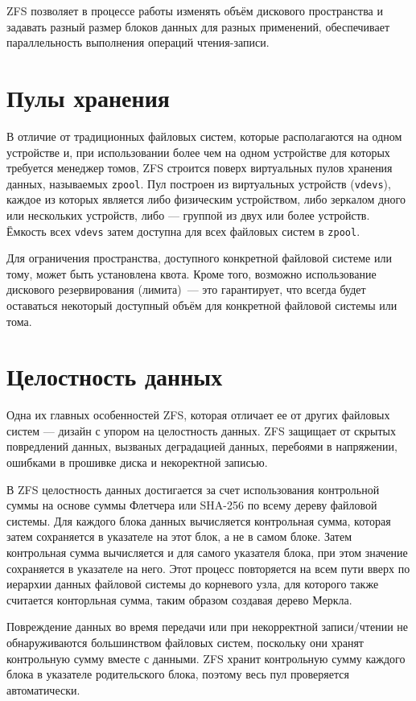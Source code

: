 \documentclass[a4page]{article}
\begin{document}
ZFS позволяет в процессе работы изменять объём дискового пространства
и задавать разный размер блоков данных для разных применений,
обеспечивает параллельность выполнения операций чтения-записи.

\section{Пулы хранения}

В отличие от традиционных файловых систем, которые располагаются на одном устройстве и,
при использовании более чем на одном устройстве для которых требуется менеджер томов,
ZFS строится поверх виртуальных пулов хранения данных, называемых \texttt{zpool}.
Пул построен из виртуальных устройств (\texttt{vdevs}),
каждое из которых является либо физическим устройством,
либо зеркалом дного или нескольких устройств,
либо --- группой из двух или более устройств.
Ёмкость всех \texttt{vdevs} затем доступна для всех файловых систем в \texttt{zpool}.

Для ограничения пространства, доступного конкретной файловой системе или тому, может быть установлена квота.
Кроме того, возможно использование дискового резервирования (лимита) --- это гарантирует,
что всегда будет оставаться некоторый доступный объём для конкретной файловой системы или тома.

\section{Целостность данных}

Одна их главных особенностей ZFS, которая отличает ее от других файловых систем --- дизайн с упором на целостность данных.
ZFS защищает от скрытых повредлений данных, вызваных деградацией данных, перебоями в напряжении, ошибками в прошивке диска и некоректной записью.

В ZFS целостность данных достигается за счет использования контрольной суммы
на основе суммы Флетчера или SHA-256 по всему дереву файловой системы.
Для каждого блока данных вычисляется контрольная сумма,
которая затем сохраняется в указателе на этот блок, а не в самом блоке.
Затем контрольная сумма вычисляется и для самого указателя блока,
при этом значение сохраняется в указателе на него.
Этот процесс повторяется на всем пути вверх по иерархии данных файловой системы до корневого узла,
для которого также считается конторльная сумма, таким образом создавая дерево Меркла.

Повреждение данных во время передачи или при некорректной записи/чтении
не обнаруживаются большинством файловых систем, поскольку они хранят контрольную сумму вместе с данными.
ZFS хранит контрольную сумму каждого блока в указателе родительского блока,
поэтому весь пул проверяется автоматически.
\end{document}
